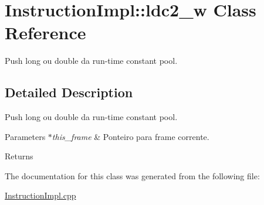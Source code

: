\hypertarget{class_instruction_impl_1_1ldc2__w}{}\section{Instruction\+Impl\+:\+:ldc2\+\_\+w Class Reference}
\label{class_instruction_impl_1_1ldc2__w}


Push long ou double da run-\/time constant pool.  




\subsection{Detailed Description}
Push long ou double da run-\/time constant pool. 


\begin{DoxyParams}{Parameters}
{\em $\ast$this\+\_\+frame} & Ponteiro para frame corrente. \\
\hline
\end{DoxyParams}
\begin{DoxyReturn}{Returns}

\end{DoxyReturn}


The documentation for this class was generated from the following file\+:\begin{DoxyCompactItemize}
\item 
\hyperlink{_instruction_impl_8cpp}{Instruction\+Impl.\+cpp}\end{DoxyCompactItemize}
